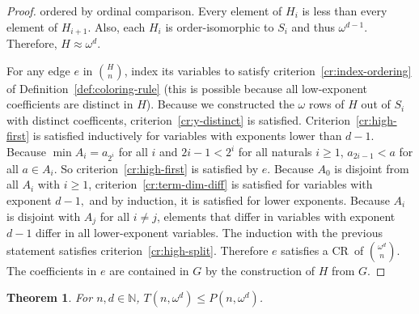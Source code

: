 \documentclass[11pt]{article}
\newcommand{\om}{\omega}
\newcommand{\oequiv}{\approx}
\newcommand{\N}{\mathbb{N}}
\newcommand{\crulenospace}{CR}
\newcommand{\crule}{\crulenospace~}
\newcommand{\numpoints}{n}
\newcommand{\commonconst}{a}
\newcommand{\Commonconst}{A}
\theoremstyle{plain}
\newtheorem{theorem}{Theorem}[section]
\theoremstyle{definition}
\begin{document}
\begin{proof}
ordered by ordinal comparison. Every element of $H_i$ is less than every element of $H_{i+1}$. Also, each $H_i$ is order-isomorphic to $S_i$ and thus $\omega^{d-1}$.
Therefore, $H \oequiv \om^{d}$.

For any edge $e$ in $\binom{H}{\numpoints}$, index its variables to satisfy criterion~\ref{cr:index-ordering} of Definition~\ref{def:coloring-rule} (this is possible because all low-exponent coefficients are distinct in $H$).
Because we constructed the $\om$ rows of $H$ out of $S_i$ with distinct coefficents,
criterion~\ref{cr:y-distinct} is satisfied.
Criterion~\ref{cr:high-first} 
is satisfied inductively for variables with exponents lower than $d-1$. Because $\min \Commonconst_i = \commonconst_{2^i}$ for all $i$ and $2i-1 < 2^i$ for all naturals
$i \geq 1$, $\commonconst_{2i-1}<\commonconst$ for all $\commonconst \in \Commonconst_i$. So criterion~\ref{cr:high-first} is satisfied by $e$. Because $\Commonconst_0$ is disjoint from all $\Commonconst_i$ with $i \geq 1$, criterion~\ref{cr:term-dim-diff} is satisfied for variables with exponent $d-1,$ and by induction, it is satisfied for lower exponents. Because $\Commonconst_i$ is disjoint with $\Commonconst_j$ for all $i \neq j$, elements that differ in variables with exponent $d-1$ differ in all lower-exponent variables. The induction with the previous statement satisfies criterion~\ref{cr:high-split}. Therefore $e$ satisfies a \crule of $\binom{\om^d}{\numpoints}$. The coefficients in $e$ are contained in $G$ by the construction of $H$ from $G$.
\end{proof}

\begin{theorem}\label{th:wd-LT}
For $\numpoints,d \in \N$, $T\left(\numpoints, \om^d\right) \leq P\left(\numpoints, \om^d\right)$.
\end{theorem} 
\end{document}

